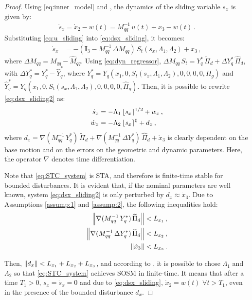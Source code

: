 \begin{proof}
%
Using \eqref{eq:inner_model} and , the dynamics of the sliding variable $s_x$ is given by:
%
\begin{align}
\dot{s}_x = \dot{x}_2 - w(t) = M^{-1}_{qq} \, u(t) + x_3 - w(t) \,.
\label{eq:dsx_sliding}
\end{align}
%
Substituting \eqref{eq:u_sliding} into \eqref{eq:dsx_sliding}, it becomes:
%
\begin{align}
\dot{s}_x &= - ( \mathbf{I}_3 - M_{qq}^{-1} \, \Delta M_{qq}  )\,S_t(s_x,\Lambda_1,\Lambda_2) + x_3 \,, 
\label{eq:dsx_sliding2}
\end{align}
%
where $\Delta M_{qq} = M_{qq} - \widehat{M}_{qq}$. Using \eqref{eq:dyn_regressor}, 
$\Delta M_{qq} \, S_t = Y^*_q \, \widetilde{\Pi}_d + \Delta Y^*_q \, \widehat{\Pi}_d$, with $\Delta Y^*_q = Y^*_q - \widehat{Y}^*_q$, where $Y^*_q = Y_q(x_1,0,S_t(s_x,\Lambda_1,\Lambda_2),0,0,0,0,\Pi_g)$ and $\widehat{Y}^*_q = Y_q(x_1,0,S_t(s_x,\Lambda_1,\Lambda_2),0,0,0,0,\widehat{\Pi}_g)$.
%
Then, it is possible to rewrite \eqref{eq:dsx_sliding2} as:
%
\begin{align}
\dot{s}_x &= - \Lambda_1 \, \lfloor s_x \rceil^{1/2} + w_x \,, \nonumber \\
\dot{w}_x &= - \Lambda_2 \, \lfloor s_x \rceil^{0} + d_x \,,
\label{eq:STC_system}
\end{align}
%
where $d_x = \nabla (M_{qq}^{-1} \, Y^*_q)\,\widetilde{\Pi}_d + \nabla (M_{qq}^{-1} \, \Delta Y^*_q)\,\widehat{\Pi}_d + \dot{x}_3$ is clearly dependent on the base motion and on the errors on the geometric and dynamic parameters. Here, the operator $\nabla$ denotes time differentiation.

Note that \eqref{eq:STC_system} is STA, and therefore is finite-time stable for bounded disturbances.
%
It is evident that, if the nominal parameters are well known, system \eqref{eq:dsx_sliding2} is only perturbed by $d_x \approx \dot{x}_3$.
%
Due to Assumptions \ref{assump:1} and \ref{assump:2}, the following inequalities hold:
%
\begin{align}
\left\lVert \nabla (M_{qq}^{-1} \, Y^*_q)\,\widetilde{\Pi}_d \right\rVert &< L_{x_1} \,, \\
\left\lVert \nabla (M_{qq}^{-1} \, \Delta Y^*_q)\,\widehat{\Pi}_d \right\rVert &< L_{x_2} \,, \\
\left\lVert \dot{x}_3 \right\rVert &< L_{x_3} \,.
\end{align}

Then, $\left\lVert d_x\right\rVert < L_{x_1} + L_{x_2} + L_{x_3}$, and according to \cite{Moreno2012}, it is possible to chose $\Lambda_1$ and $\Lambda_2$ so that \eqref{eq:STC_system} achieves SOSM in finite-time. 
%
It means that after a time $T_1>0$, $s_x = \dot{s}_x = 0$ and due to \eqref{eq:dsx_sliding}, $\dot{x}_2 = w(t) \,\, \forall t>T_1$, even in the presence of the bounded disturbance $d_x$.


\end{proof}
